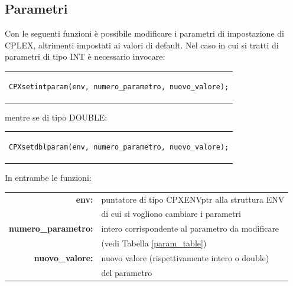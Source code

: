 \subsection{Parametri}\label{param}
Con le seguenti funzioni è possibile modificare i parametri di impostazione di CPLEX, altrimenti impostati ai valori di default.
Nel caso in cui si tratti di parametri di tipo INT è necessario invocare:\\
\begin{center}
\begin{tabular}{c}
\begin{lstlisting}[linewidth=330pt, basicstyle=\footnotesize\sffamily,]     
CPXsetintparam(env, numero_parametro, nuovo_valore);
\end{lstlisting}
\end{tabular}
\end{center}
mentre se di tipo DOUBLE:\\
\begin{center}
\begin{tabular}{c}
\begin{lstlisting}[linewidth=330pt, basicstyle=\footnotesize\sffamily,]     
CPXsetdblparam(env, numero_parametro, nuovo_valore);
\end{lstlisting}
\end{tabular}
\end{center}
In entrambe le funzioni:
\begin{table}[h]
\centering
\begin{tabular}{rl}
\textbf{env:} & {puntatore di tipo CPXENVptr alla struttura ENV}\\
& {di cui si vogliono cambiare i parametri}\\
\textbf{numero\_parametro:} & {intero corrispondente al parametro da modificare}\\
& {(vedi Tabella \ref{param_table})}\\
\textbf{nuovo\_valore:} & {nuovo valore (rispettivamente intero o double)}\\
& {del parametro}\\
\end{tabular}
\end{table}

